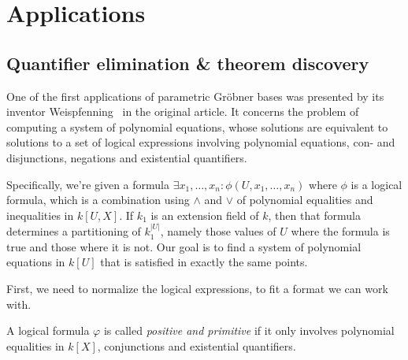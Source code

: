 \section{Applications}

\subsection{Quantifier elimination \& theorem discovery}
One of the first applications of parametric Gröbner bases was presented by its inventor Weispfenning~\cite{Weispfenning} in the original article. It concerns the problem of computing a system of polynomial equations, whose solutions are equivalent to solutions to a set of logical expressions involving polynomial equations, con- and disjunctions, negations and existential quantifiers.

Specifically, we're given a formula $\exists x_{1}, \dots, x_{n} : \phi(U, x_{1}, \dots, x_{n})$ where $\phi$ is a logical formula, which is a combination using $\land$ and $\lor$ of polynomial equalities and inequalities in $k[U, X]$. If $k_{1}$ is an extension field of $k$, then that formula determines a partitioning of $k_{1}^{|U|}$, namely those values of $U$ where the formula is true and those where it is not. Our goal is to find a system of polynomial equations in $k[U]$ that is satisfied in exactly the same points.

First, we need to normalize the logical expressions, to fit a format we can work with.

\begin{definition}
  A logical formula $\varphi$ is called \textit{positive and primitive} if it only involves polynomial equalities in $k[X]$, conjunctions and existential quantifiers.
\end{definition}

